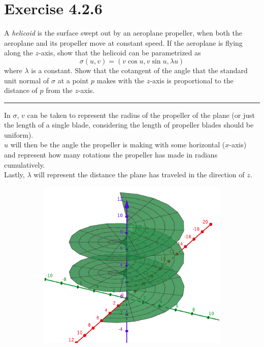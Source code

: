 \documentclass[12pt]{article}
\begin{document}
\maketitle

\section*{Exercise 4.2.6}
\indent
A \emph{helicoid} is the surface swept out by an aeroplane propeller, when both the aeroplane and its propeller move at constant speed. If the aeroplane is flying along the $z$-axis, show that the helicoid can be parametrized as
$$
\sigma(u, v) = (v \cos u, v \sin u, \lambda u)
$$
where $\lambda$ is a constant. Show that the cotangent of the angle that the standard unit normal of $\sigma$ at a point $p$ makes with the $z$-axis is proportional to the distance of $p$ from the $z$-axis.

\vspace{1cm}
\hrule
\vspace{1cm}
\noindent

In $\sigma$, $v$ can be taken to represent the radius of the propeller of the plane (or just the length of a single blade, considering the length of propeller blades should be uniform).\\
\indent
$u$ will then be the angle the propeller is making with some horizontal ($x$-axis) and represent how many rotations the propeller has made in radians cumulatively.\\
\indent
Lastly, $\lambda$ will represent the distance the plane has traveled in the direction of $z$.\\

\begin{figure}[h!]
\centering
\begin{subfigure}[b]{0.4\linewidth}
\includegraphics[width=\linewidth]{./assets/4-2-6/helicoid1.png}
\end{subfigure}
\end{figure}
\indent
\end{document}
